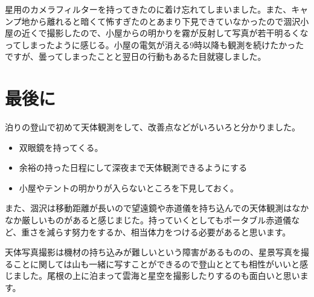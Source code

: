 \documentclass[../main]{subfiles}
\begin{document}
\vspace{0.5cm}

星用のカメラフィルターを持ってきたのに着け忘れてしまいました。また、キャンプ地から離れると暗くて怖すぎたのとあまり下見できていなかったので涸沢小屋の近くで撮影したので、小屋からの明かりを霧が反射して写真が若干明るくなってしまったように感じる。小屋の電気が消える9時以降も観測を続けたかったですが、曇ってしまったことと翌日の行動もあるた目就寝しました。

\section{最後に}

泊りの登山で初めて天体観測をして、改善点などがいろいろと分かりました。

\begin{itemize}
  \item 双眼鏡を持ってくる。
  \item 余裕の持った日程にして深夜まで天体観測できるようにする
  \item 小屋やテントの明かりが入らないところを下見しておく。
\end{itemize}

また、涸沢は移動距離が長いので望遠鏡や赤道儀を持ち込んでの天体観測はなかなか厳しいものがあると感じまじた。持っていくとしてもポータブル赤道儀など、重さを減らす努力をするか、相当体力をつける必要があると思います。

天体写真撮影は機材の持ち込みが難しいという障害があるものの、星景写真を撮ることに関しては山も一緒に写すことができるので登山ととても相性がいいと感じました。尾根の上に泊まって雲海と星空を撮影したりするのも面白いと思います。
\end{document}
